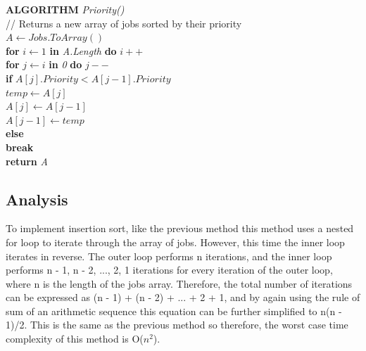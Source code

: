 \documentclass[12pt,a4paper]{article}
\begin{document}
			\textbf{ALGORITHM} \textit{Priority()}\\
			\null\hspace{1cm}// Returns a new array of jobs sorted by their priority\\
			\null\hspace{1cm}\textit{$A \gets Jobs.ToArray()$}\\
			\null\hspace{1cm}\textbf{for} \textit{$i \gets 1$} \textbf{in} \textit{A.Length} \textbf{do} \textit{$i++$}\\
			\null\hspace{2cm}\textbf{for} \textit{$j \gets i$} \textbf{in} \textit{0} \textbf{do} \textit{$j--$}\\
			\null\hspace{3cm}\textbf{if} \textit{$A[j].Priority < A[j - 1].Priority$}\\
			\null\hspace{4cm}\textit{$temp \gets A[j]$}\\
			\null\hspace{4cm}\textit{$A[j] \gets A[j - 1]$}\\
			\null\hspace{4cm}\textit{$A[j - 1] \gets temp$}\\
			\null\hspace{3cm}\textbf{else}\\
			\null\hspace{4cm}\textbf{break}\\
			\null\hspace{1cm}\textbf{return} \textit{A}\\
		
		\subsection{Analysis}
			To implement insertion sort, like the previous method this method uses a nested for loop to 
			iterate through the array of jobs. However, this time the inner loop iterates in reverse. 
			The outer loop performs n iterations, and the inner loop performs n - 1, n - 2, ..., 2, 1 
			iterations for every iteration of the outer loop, where n is the length of the jobs array. Therefore, 
			the total number of iterations can be expressed as (n - 1) + (n - 2) + ... + 2 + 1, and by again 
			using the rule of sum of an arithmetic sequence this equation can be further simplified to n(n - 1)/2. 
			This is the same as the previous method so therefore, the worst case time complexity of this method 
			is O($n ^ 2$).\\
\end{document}
